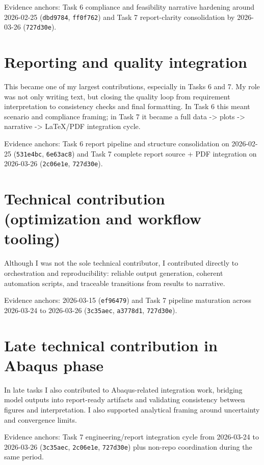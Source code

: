 \noindent Evidence anchors: Task 6 compliance and feasibility narrative hardening around 2026-02-25 (\texttt{dbd9784}, \texttt{ff0f762}) and Task 7 report-clarity consolidation by 2026-03-26 (\texttt{727d30e}).


\section{Reporting and quality integration}


\noindent This became one of my largest contributions, especially in Tasks 6 and 7. My role was not only writing text, but closing the quality loop from requirement interpretation to consistency checks and final formatting. In Task 6 this meant scenario and compliance framing; in Task 7 it became a full data -> plots -> narrative -> LaTeX/PDF integration cycle.

\noindent Evidence anchors: Task 6 report pipeline and structure consolidation on 2026-02-25 (\texttt{531e4bc}, \texttt{6e63ac8}) and Task 7 complete report source + PDF integration on 2026-03-26 (\texttt{2c06e1e}, \texttt{727d30e}).


\section{Technical contribution (optimization and workflow tooling)}


\noindent Although I was not the sole technical contributor, I contributed directly to orchestration and reproducibility: reliable output generation, coherent automation scripts, and traceable transitions from results to narrative.

\noindent Evidence anchors: 2026-03-15 (\texttt{ef96479}) and Task 7 pipeline maturation across 2026-03-24 to 2026-03-26 (\texttt{3c35aec}, \texttt{a3778d1}, \texttt{727d30e}).


\section{Late technical contribution in Abaqus phase}


\noindent In late tasks I also contributed to Abaqus-related integration work, bridging model outputs into report-ready artifacts and validating consistency between figures and interpretation. I also supported analytical framing around uncertainty and convergence limits.

\noindent Evidence anchors: Task 7 engineering/report integration cycle from 2026-03-24 to 2026-03-26 (\texttt{3c35aec}, \texttt{2c06e1e}, \texttt{727d30e}) plus non-repo coordination during the same period.


